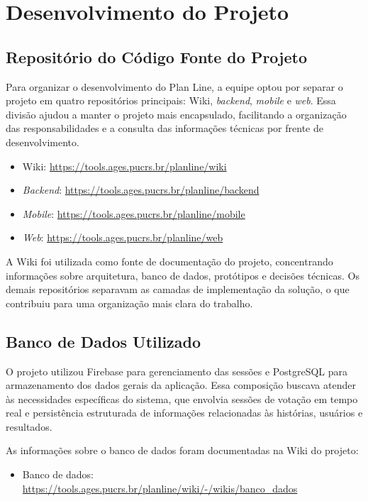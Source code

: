 \section[Desenvolvimento do Projeto]{Desenvolvimento do Projeto}

\subsection{Repositório do Código Fonte do Projeto}

Para organizar o desenvolvimento do Plan Line, a equipe optou por separar o projeto em quatro repositórios principais: Wiki, \textit{backend}, \textit{mobile} e \textit{web}. Essa divisão ajudou a manter o projeto mais encapsulado, facilitando a organização das responsabilidades e a consulta das informações técnicas por frente de desenvolvimento.

{\footnotesize
\begin{itemize}
    \item Wiki: \url{https://tools.ages.pucrs.br/planline/wiki}
    \item \textit{Backend}: \url{https://tools.ages.pucrs.br/planline/backend}
    \item \textit{Mobile}: \url{https://tools.ages.pucrs.br/planline/mobile}
    \item \textit{Web}: \url{https://tools.ages.pucrs.br/planline/web}
\end{itemize}
}

A Wiki foi utilizada como fonte de documentação do projeto, concentrando informações sobre arquitetura, banco de dados, protótipos e decisões técnicas. Os demais repositórios separavam as camadas de implementação da solução, o que contribuiu para uma organização mais clara do trabalho.

\subsection{Banco de Dados Utilizado}

O projeto utilizou Firebase para gerenciamento das sessões e PostgreSQL para armazenamento dos dados gerais da aplicação. Essa composição buscava atender às necessidades específicas do sistema, que envolvia sessões de votação em tempo real e persistência estruturada de informações relacionadas às histórias, usuários e resultados.

As informações sobre o banco de dados foram documentadas na Wiki do projeto:

{\footnotesize
\begin{itemize}
    \item Banco de dados: \url{https://tools.ages.pucrs.br/planline/wiki/-/wikis/banco_dados}
\end{itemize}
}

